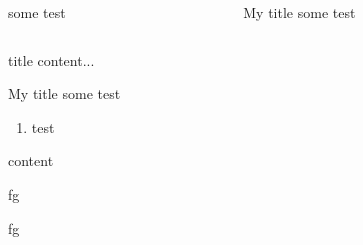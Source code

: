 \documentclass[
]{beamer}
\begin{document}
\begin{frame}
\begin{columns}[onlytextwidth]
\begin{column}{.4\textwidth}
  \begin{block}{}
  some test
  \end{block}
\end{column}
\begin{column}{.4\textwidth}
  \begin{exampleblock}{My title}
  some test
  \end{exampleblock}
\end{column}
\end{columns}

\begin{block}{title}
content...

  \begin{alertblock}{My title}
  some test
  \begin{enumerate}
  \item test
  \end{enumerate}
  \end{alertblock}

content
\end{block}

\begin{tcolorbox}[
  title=foo,
]
fg
\end{tcolorbox}

\begin{tcolorbox}%
fg
\end{tcolorbox}

\end{frame}
\end{document}
